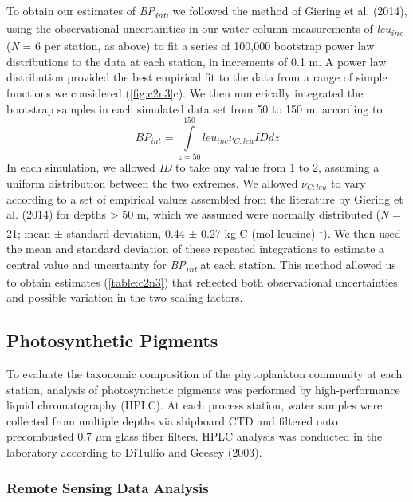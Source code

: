 To obtain our estimates of \emph{BP\textsubscript{int}}, we followed the method of Giering et al. (2014), using the observational uncertainties in our water column measurements of \emph{leu\textsubscript{inc}} (\emph{N}  = 6 per station, as above) to fit a series of 100,000 bootstrap power law distributions to the data at each station, in increments of 0.1 m. A power law distribution provided the best empirical fit to the data from a range of simple functions we considered (\autoref{fig:c2n3}c). We then numerically integrated the bootstrap samples in each simulated data set from 50 to 150 m, according to
\begin{equation} \label{eq:c2e2}
B{P_{int}} = \int\limits_{z = 50}^{150} {le{u_{inc}}{\nu _{C:leu}}IDdz}
\end{equation}
In each simulation, we allowed \emph{ID} to take any value from 1 to 2, assuming a uniform distribution between the two extremes. We allowed $\nu _{C:leu}$ to vary according to a set of empirical values assembled from the literature by Giering et al. (2014) for depths \textgreater{} 50 m, which we assumed were normally distributed (\emph{N} = 21; mean $\pm$ standard deviation, 0.44 $\pm$ 0.27 kg C (mol leucine)\textsuperscript{-1}). We then used the mean and standard deviation of these repeated integrations to estimate a central value and uncertainty for \emph{BP\textsubscript{int}} at each station. This method allowed us to obtain estimates (\autoref{table:c2n3}) that reflected both observational uncertainties and possible variation in the two scaling factors.

\subsection{Photosynthetic Pigments}
\label{sec:Photosynthetic Pigments}

To evaluate the taxonomic composition of the phytoplankton community at each station, analysis of photosynthetic pigments was performed by high-performance liquid chromatography (HPLC). At each process station, water samples were collected from multiple depths via shipboard CTD and filtered onto precombusted 0.7 $\mu$m glass fiber filters. HPLC analysis was conducted in the laboratory according to DiTullio and Geesey (2003).

\subsubsection{Remote Sensing Data Analysis}

